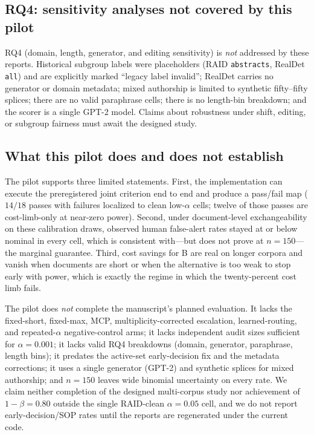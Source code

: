 \documentclass[pdflatex,sn-mathphys-num]{sn-jnl}
\begin{document}
\subsection{RQ4: sensitivity analyses not covered by this pilot}

RQ4 (domain, length, generator, and editing sensitivity) is \emph{not} addressed by these reports. Historical subgroup labels were placeholders (RAID \texttt{abstracts}, RealDet \texttt{all}) and are explicitly marked ``legacy label invalid''; RealDet carries no generator or domain metadata; mixed authorship is limited to synthetic fifty--fifty splices; there are no valid paraphrase cells; there is no length-bin breakdown; and the scorer is a single GPT-2 model. Claims about robustness under shift, editing, or subgroup fairness must await the designed study.

\subsection{What this pilot does and does not establish}

The pilot supports three limited statements. First, the implementation can execute the preregistered joint criterion end to end and produce a pass/fail map (\(14/18\) passes with failures localized to clean low-\(\alpha\) cells; twelve of those passes are cost-limb-only at near-zero power). Second, under document-level exchangeability on these calibration draws, observed human false-alert rates stayed at or below nominal in every cell, which is consistent with---but does not prove at \(n=150\)---the marginal guarantee. Third, cost savings for B are real on longer corpora and vanish when documents are short or when the alternative is too weak to stop early with power, which is exactly the regime in which the twenty-percent cost limb fails.

The pilot does \emph{not} complete the manuscript's planned evaluation. It lacks the fixed-short, fixed-max, MCP, multiplicity-corrected escalation, learned-routing, and repeated-\(\alpha\) negative-control arms; it lacks independent audit sizes sufficient for \(\alpha=0.001\); it lacks valid RQ4 breakdowns (domain, generator, paraphrase, length bins); it predates the active-set early-decision fix and the metadata corrections; it uses a single generator (GPT-2) and synthetic splices for mixed authorship; and \(n=150\) leaves wide binomial uncertainty on every rate. We claim neither completion of the designed multi-corpus study nor achievement of \(1-\beta=0.80\) outside the single RAID-clean \(\alpha=0.05\) cell, and we do not report early-decision/SOP rates until the reports are regenerated under the current code.
\end{document}
